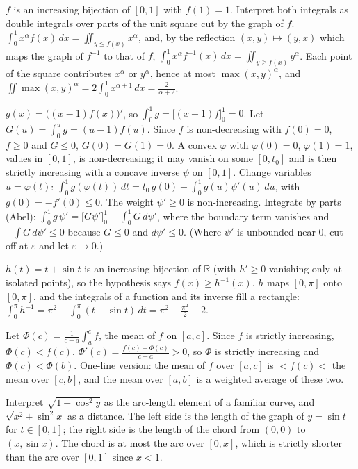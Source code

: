 \documentclass[11pt,a4paper]{article}
\begin{document}
 $f$ is an increasing bijection of $[0,1]$ with $f(1)=1$. Interpret both integrals as double integrals over parts of the unit square cut by the graph of $f$.
 $\int_0^1x^\alpha f(x)\,dx=\iint_{y\le f(x)}x^\alpha$, and, by the reflection $(x,y)\mapsto(y,x)$ which maps the graph of $f^{-1}$ to that of $f$, $\int_0^1x^\alpha f^{-1}(x)\,dx=\iint_{y\ge f(x)}y^\alpha$.
 Each point of the square contributes $x^\alpha$ or $y^\alpha$, hence at most $\max(x,y)^\alpha$, and $\iint\max(x,y)^\alpha=2\int_0^1x^{\alpha+1}\,dx=\frac2{\alpha+2}$.

 $g(x)=\big((x-1)f(x)\big)'$, so $\int_0^1g=\big[(x-1)f\big]_0^1=0$.
 Let $G(u)=\int_0^ug=(u-1)f(u)$. Since $f$ is non-decreasing with $f(0)=0$, $f\ge0$ and $G\le0$, $G(0)=G(1)=0$.
 A convex $\varphi$ with $\varphi(0)=0$, $\varphi(1)=1$, values in $[0,1]$, is non-decreasing; it may vanish on some $[0,t_0]$ and is then strictly increasing with a concave inverse $\psi$ on $[0,1]$. Change variables $u=\varphi(t)$: $\int_0^1g(\varphi(t))\,dt=t_0\,g(0)+\int_0^1g(u)\psi'(u)\,du$, with $g(0)=-f'(0)\le0$.
 The weight $\psi'\ge0$ is non-increasing. Integrate by parts (Abel): $\int_0^1g\,\psi'=\big[G\psi'\big]_0^1-\int_0^1G\,d\psi'$, where the boundary term vanishes and $-\int G\,d\psi'\le0$ because $G\le0$ and $d\psi'\le0$. (Where $\psi'$ is unbounded near $0$, cut off at $\varepsilon$ and let $\varepsilon\to0$.)

 $h(t)=t+\sin t$ is an increasing bijection of $\mathbb R$ (with $h'\ge0$ vanishing only at isolated points), so the hypothesis says $f(x)\ge h^{-1}(x)$.
 $h$ maps $[0,\pi]$ onto $[0,\pi]$, and the integrals of a function and its inverse fill a rectangle: $\int_0^\pi h^{-1}=\pi^2-\int_0^\pi(t+\sin t)\,dt=\pi^2-\frac{\pi^2}2-2$.

 Let $\Phi(c)=\frac1{c-a}\int_a^cf$, the mean of $f$ on $[a,c]$. Since $f$ is strictly increasing, $\Phi(c)<f(c)$.
 $\Phi'(c)=\frac{f(c)-\Phi(c)}{c-a}>0$, so $\Phi$ is strictly increasing and $\Phi(c)<\Phi(b)$. One-line version: the mean of $f$ over $[a,c]$ is $<f(c)<$ the mean over $[c,b]$, and the mean over $[a,b]$ is a weighted average of these two.

 Interpret $\sqrt{1+\cos^2y}$ as the arc-length element of a familiar curve, and $\sqrt{x^2+\sin^2x}$ as a distance.
 The left side is the length of the graph of $y=\sin t$ for $t\in[0,1]$; the right side is the length of the chord from $(0,0)$ to $(x,\sin x)$. The chord is at most the arc over $[0,x]$, which is strictly shorter than the arc over $[0,1]$ since $x<1$.
\end{document}
